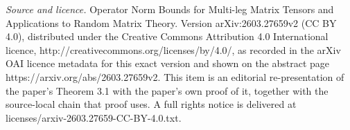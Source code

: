 \documentclass[10pt,a4paper]{amsart}
\numberwithin{equation}{section}
\theoremstyle{plain}
\begin{document}
\maketitle
\vspace{1em}
\noindent\textit{Source and licence.} Operator Norm Bounds for Multi-leg Matrix Tensors and Applications to Random Matrix Theory. Version arXiv:2603.27659v2 (CC BY 4.0), distributed under the Creative Commons Attribution 4.0 International licence, http://creativecommons.org/licenses/by/4.0/, as recorded in the arXiv OAI licence metadata for this exact version and shown on the abstract page https://arxiv.org/abs/2603.27659v2. This item is an editorial re-presentation of the paper's Theorem 3.1 with the paper's own proof of it, together with the source-local chain that proof uses. A full rights notice is delivered at licenses/arxiv-2603.27659-CC-BY-4.0.txt.
\end{document}
